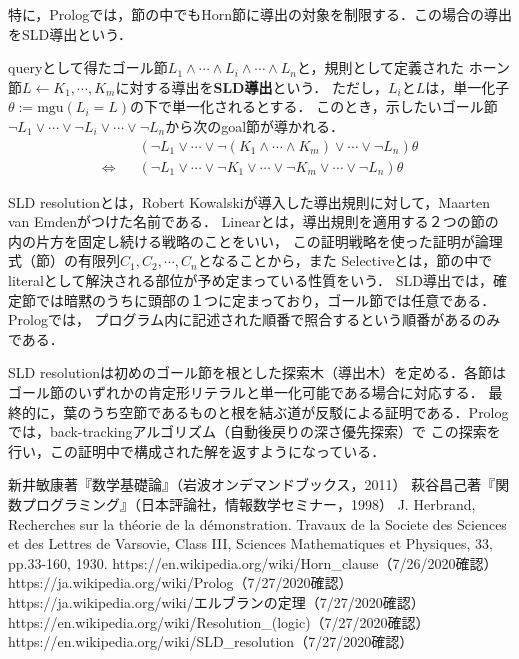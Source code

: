 \documentclass[uplatex,dvipdfmx]{jsarticle}
\begin{document}
特に，Prologでは，節の中でもHorn節に導出の対象を制限する．この場合の導出をSLD導出という．

\begin{definition}\label{def-SLD-resolution}
    queryとして得たゴール節$L_1\land\cdots\land L_i\land\cdots\land L_n$と，規則として定義された
    ホーン節$L\leftarrow K_1,\cdots,K_m$に対する導出を\textbf{SLD導出}という．
    ただし，$L_i$と$L$は，単一化子$\theta:=\mathrm{mgu}(L_i=L)$の下で単一化されるとする．
    このとき，示したいゴール節$\lnot L_1\lor\cdots\lor \lnot L_i\lor\cdots\lor \lnot L_n$から次のgoal節が導かれる．
    \begin{align*}
        &(\lnot L_1\lor\cdots\lor \lnot(K_1\land\cdots\land K_m) \lor\cdots\lor \lnot L_n)\theta \\
        \Longleftrightarrow\;\;\;&(\lnot L_1\lor\cdots\lor \lnot K_1\lor\cdots\lor\lnot K_m \lor\cdots\lor \lnot L_n)\theta
    \end{align*}
\end{definition}
\begin{remark}
    SLD resolutionとは，Robert Kowalskiが導入した導出規則に対して，Maarten van Emdenがつけた名前である\cite{SLD-resolution}．
    Linearとは，導出規則を適用する２つの節の内の片方を固定し続ける戦略のことをいい，
    この証明戦略を使った証明が論理式（節）の有限列$C_1,C_2,\cdots,C_n$となることから，また
    Selectiveとは，節の中でliteralとして解決される部位が予め定まっている性質をいう．
    SLD導出では，確定節では暗黙のうちに頭部の１つに定まっており，ゴール節では任意である．Prologでは，
    プログラム内に記述された順番で照合するという順番があるのみである．

    SLD resolutionは初めのゴール節を根とした探索木（導出木）を定める．各節はゴール節のいずれかの肯定形リテラルと単一化可能である場合に対応する．
    最終的に，葉のうち空節であるものと根を結ぶ道が反駁による証明である．Prologでは，back-trackingアルゴリズム（自動後戻りの深さ優先探索）で
    この探索を行い，この証明中で構成された解を返すようになっている．
\end{remark}



\begin{thebibliography}{9}
    新井敏康著『数学基礎論』（岩波オンデマンドブックス，2011）
    萩谷昌己著『関数プログラミング』（日本評論社，情報数学セミナー，1998）
    J. Herbrand, Recherches sur la théorie de la démonstration. Travaux de la Societe des Sciences et des Lettres de Varsovie, Class III, Sciences Mathematiques et Physiques, 33, pp.33-160, 1930.
    https://en.wikipedia.org/wiki/Horn\_clause（7/26/2020確認）
    https://ja.wikipedia.org/wiki/Prolog（7/27/2020確認）
    https://ja.wikipedia.org/wiki/エルブランの定理（7/27/2020確認）
    https://en.wikipedia.org/wiki/Resolution\_(logic)（7/27/2020確認）
    https://en.wikipedia.org/wiki/SLD\_resolution（7/27/2020確認）
\end{thebibliography}
\end{document}
